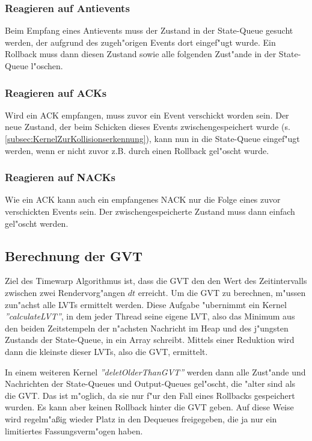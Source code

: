 \documentclass[a4paper, 10pt, openright, parskip, chapterprefix]{scrreprt}
\begin{document}
\subsubsection{Reagieren auf Antievents}
Beim Empfang eines Antievents muss der Zustand in der State-Queue gesucht werden, der aufgrund des zugeh"origen Events
dort eingef"ugt wurde. Ein Rollback muss dann diesen Zustand sowie alle folgenden Zust"ande in der State-Queue
l"oschen.

\subsubsection{Reagieren auf ACKs}
\label{subsubsed:ReagierenAufACKs}
Wird ein ACK empfangen, muss zuvor ein Event verschickt worden sein. Der neue Zustand, der beim Schicken dieses
Events zwischengespeichert wurde (s. \ref{subsec:KernelZurKollisionserkennung}), kann nun in die State-Queue eingef"ugt
werden, wenn er nicht zuvor z.B. durch einen Rollback gel"oscht wurde.

\subsubsection{Reagieren auf NACKs}
Wie ein ACK kann auch ein empfangenes NACK nur die Folge eines zuvor verschickten Events sein. Der zwischengespeicherte
Zustand muss dann einfach gel"oscht werden.

\subsection{Berechnung der GVT}
Ziel des Timewarp Algorithmus ist, dass die GVT den den Wert des Zeitintervalls zwischen zwei Rendervorg"angen $dt$
erreicht. Um die GVT zu berechnen, m"ussen zun"achst alle LVTs ermittelt werden. Diese Aufgabe "ubernimmt ein Kernel
\emph{''calculateLVT''}, in dem jeder Thread seine eigene LVT, also das Minimum aus den beiden Zeitstempeln der
n"achsten Nachricht im Heap und des j"ungsten Zustands der State-Queue, in ein Array schreibt. Mittels einer Reduktion
wird dann die kleinste dieser LVTs, also die GVT, ermittelt.

In einem weiteren Kernel \emph{''deletOlderThanGVT''} werden dann alle Zust"ande und Nachrichten der State-Queues und
Output-Queues gel"oscht, die "alter sind als die GVT. Das ist m"oglich, da sie nur f"ur den Fall eines Rollbacks
gespeichert wurden. Es kann aber keinen Rollback hinter die GVT geben. Auf diese Weise wird regelm"a\ss ig wieder Platz
in den Dequeues freigegeben, die ja nur ein limitiertes Fassungsverm"ogen haben.
\end{document}
